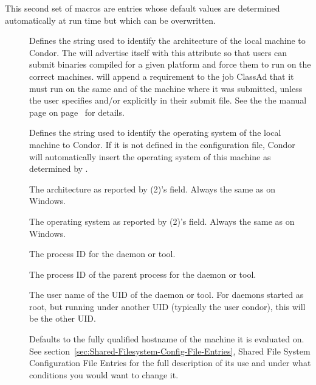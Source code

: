 This second set of macros are entries whose default values are
determined automatically at run time but which can be overwritten.  
\begin{description}

\item[] \label{param:Arch}
  Defines the string
  used to identify the architecture of the local machine to Condor.
  The  will advertise itself with this attribute so
  that users can submit binaries compiled for a given platform and
  force them to run on the correct machines.   will
  append a requirement to the job ClassAd that it must
  run on the same  and  of the machine where
  it was submitted, unless the user specifies  and/or
   explicitly in their submit file.  See the
  the  manual page
  on page~\pageref{man-condor-submit} for details.

\item[] \label{param:OpSys}
  Defines the string used to identify the operating system
  of the local machine to Condor.
  If it is not defined in the configuration file, Condor will
  automatically insert the operating system of this machine as
  determined by .

\item[] \label{param:UnameArch}
  The architecture as reported by (2)'s  field.
  Always the same as  on Windows.

\item[] \label{param:UnameOpsys}
  The operating system as reported by (2)'s  field.
  Always the same as  on Windows.

\item[] \label{param:Pid}
  The process ID for the daemon or tool.

\item[] \label{param:Ppid}
  The process ID of the parent process for the daemon or tool.

\item[] \label{param:Username}
  The user name of the UID of the daemon or tool.
  For daemons started as root, but running under another UID
  (typically the user condor), this will be the other UID.

\item[]
  \label{param:FilesystemDomain}
  Defaults to the fully
  qualified hostname of the machine it is evaluated on.  See
  section~\ref{sec:Shared-Filesystem-Config-File-Entries}, Shared
  File System Configuration File Entries for the full description of
  its use and under what conditions you would want to change it.


\end{description}
